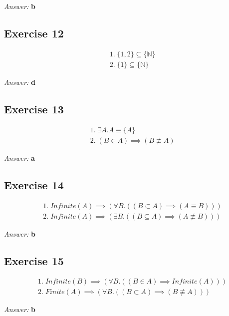 \documentclass[11pt]{article}
\begin{document}
\emph{Answer:} \textbf{b}
\subsection{Exercise 12}
\label{sec-2-12}
\begin{equation}
\begin{split}
& 1.\; \{1, 2\} \subseteq \{\mathbb{N}\} \\
& 2.\; \{1\} \subseteq \{\mathbb{N}\}
\end{split}
\end{equation}

\emph{Answer:} \textbf{d}
\subsection{Exercise 13}
\label{sec-2-13}
\begin{equation}
\begin{split}
& 1.\; \exists A. A \equiv \{A\} \\
& 2.\; (B \in A) \implies (B \not \equiv A)
\end{split}
\end{equation}

\emph{Answer:} \textbf{a}
\subsection{Exercise 14}
\label{sec-2-14}
\begin{equation}
\begin{split}
& 1.\; Infinite(A) \implies (\forall B. ((B \subset A) \implies (A \equiv B))) \\
& 2.\; Infinite(A) \implies (\exists B. ((B \subseteq A) \implies (A \not \equiv B)))
\end{split}
\end{equation}

\emph{Answer:} \textbf{b}
\subsection{Exercise 15}
\label{sec-2-15}
\begin{equation}
\begin{split}
& 1.\; Infinite(B) \implies (\forall B. ((B \in A) \implies Infinite(A))) \\
& 2.\; Finite(A) \implies (\forall B. ((B \subset A) \implies (B \not \equiv A)))
\end{split}
\end{equation}

\emph{Answer:} \textbf{b}
\end{document}
